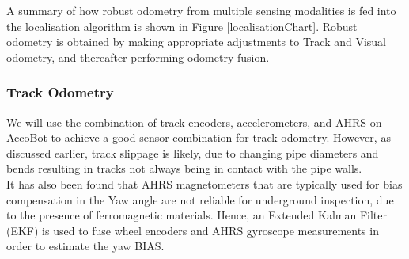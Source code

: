 \documentclass[11pt]{article}		%
\newcommand{\figref}[1]{\hyperref[#1]{Figure \ref*{#1}}}    %
\begin{document}
	\hspace*{3ex}A summary of how robust odometry from multiple sensing modalities is fed into the localisation algorithm is shown in \figref{localisationChart}. Robust odometry is obtained by making appropriate adjustments to Track and Visual odometry, and thereafter performing odometry fusion.
  \subsubsection{Track Odometry}
		We will use the combination of track encoders, accelerometers, and AHRS on AccoBot to achieve a good sensor combination for track odometry. However, as discussed earlier, track slippage is likely, due to changing pipe diameters and bends resulting in tracks not always being in contact with the pipe walls. 
		\\It has also been found that AHRS magnetometers that are typically used for bias compensation in the Yaw angle are not reliable for underground inspection, due to the presence of ferromagnetic materials. Hence, an Extended Kalman Filter (EKF) is used to fuse wheel encoders and AHRS gyroscope measurements in order to estimate the yaw BIAS. 
\end{document}
